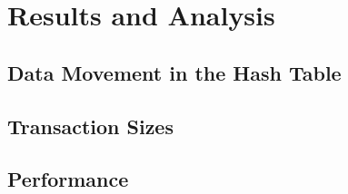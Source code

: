 \section{Results and Analysis}


\subsection{Data Movement in the Hash Table}

\subsection{Transaction Sizes}

\subsection{Performance}

